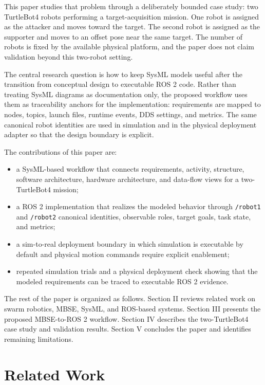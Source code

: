 \documentclass{ieeeaccess}
\begin{document}
This paper studies that problem through a deliberately bounded case study: two TurtleBot4 robots performing a target-acquisition mission. One robot is assigned as the attacker and moves toward the target. The second robot is assigned as the supporter and moves to an offset pose near the same target. The number of robots is fixed by the available physical platform, and the paper does not claim validation beyond this two-robot setting.

The central research question is how to keep SysML models useful after the transition from conceptual design to executable ROS 2 code. Rather than treating SysML diagrams as documentation only, the proposed workflow uses them as traceability anchors for the implementation: requirements are mapped to nodes, topics, launch files, runtime events, DDS settings, and metrics. The same canonical robot identities are used in simulation and in the physical deployment adapter so that the design boundary is explicit.

The contributions of this paper are:
\begin{itemize}
    \item a SysML-based workflow that connects requirements, activity, structure, software architecture, hardware architecture, and data-flow views for a two-TurtleBot4 mission;
    \item a ROS 2 implementation that realizes the modeled behavior through \texttt{/robot1} and \texttt{/robot2} canonical identities, observable roles, target goals, task state, and metrics;
    \item a sim-to-real deployment boundary in which simulation is executable by default and physical motion commands require explicit enablement;
    \item repeated simulation trials and a physical deployment check showing that the modeled requirements can be traced to executable ROS 2 evidence.
\end{itemize}

The rest of the paper is organized as follows. Section II reviews related work on swarm robotics, MBSE, SysML, and ROS-based systems. Section III presents the proposed MBSE-to-ROS 2 workflow. Section IV describes the two-TurtleBot4 case study and validation results. Section V concludes the paper and identifies remaining limitations.

\section{Related Work}
\end{document}
